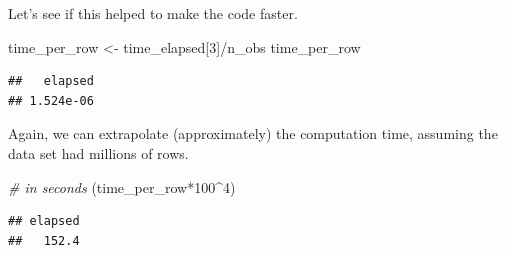 \documentclass[
  12pt,
]{style/krantz}
\newenvironment{Shaded}{\begin{snugshade}}{\end{snugshade}}
\newcommand{\CommentTok}[1]{\textcolor[rgb]{0.56,0.35,0.01}{\textit{#1}}}
\newcommand{\ConstantTok}[1]{\textcolor[rgb]{0.00,0.00,0.00}{#1}}
\newcommand{\ControlFlowTok}[1]{\textcolor[rgb]{0.13,0.29,0.53}{\textbf{#1}}}
\newcommand{\DecValTok}[1]{\textcolor[rgb]{0.00,0.00,0.81}{#1}}
\newcommand{\FloatTok}[1]{\textcolor[rgb]{0.00,0.00,0.81}{#1}}
\newcommand{\FunctionTok}[1]{\textcolor[rgb]{0.00,0.00,0.00}{#1}}
\newcommand{\NormalTok}[1]{#1}
\newcommand{\OtherTok}[1]{\textcolor[rgb]{0.56,0.35,0.01}{#1}}
\newcommand{\SpecialCharTok}[1]{\textcolor[rgb]{0.00,0.00,0.00}{#1}}
\begin{document}
\begin{Shaded}
\end{Shaded}

Let's see if this helped to make the code faster.

\begin{Shaded}
\begin{Highlighting}[]
\NormalTok{time\_per\_row }\OtherTok{\textless{}{-}}\NormalTok{ time\_elapsed[}\DecValTok{3}\NormalTok{]}\SpecialCharTok{/}\NormalTok{n\_obs}
\NormalTok{time\_per\_row}
\end{Highlighting}
\end{Shaded}

\begin{verbatim}
##   elapsed 
## 1.524e-06
\end{verbatim}

Again, we can extrapolate (approximately) the computation time, assuming the data set had millions of rows.

\begin{Shaded}
\begin{Highlighting}[]
\CommentTok{\# in seconds}
\NormalTok{(time\_per\_row}\SpecialCharTok{*}\DecValTok{100}\SpecialCharTok{\^{}}\DecValTok{4}\NormalTok{) }
\end{Highlighting}
\end{Shaded}

\begin{verbatim}
## elapsed 
##   152.4
\end{verbatim}
\end{document}
